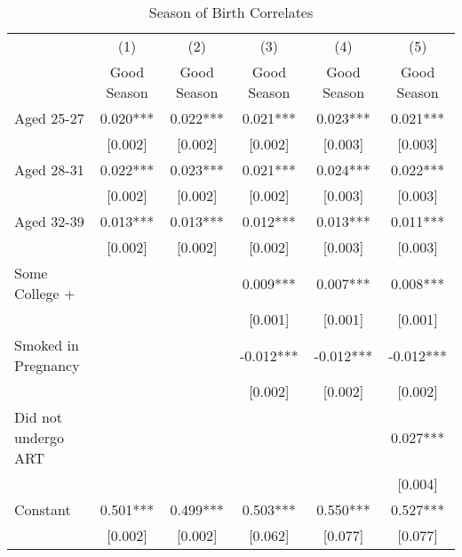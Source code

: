 \documentclass[a4paper, 12 pt]{article}
\theoremstyle{plain}
\begin{document}
\begin{doublespace}
\vspace{10mm}

\begin{table}[htbp]\centering
\def\sym#1{\ifmmode^{#1}\else\(^{#1}\)\fi}
\caption{Season of Birth Correlates  \label{tab:bqMain}}
\begin{tabular}{l*{5}{c}}
\toprule
                    &\multicolumn{1}{c}{(1)}   &\multicolumn{1}{c}{(2)}     &\multicolumn{1}{c}{(3)}   &\multicolumn{1}{c}{(4)}   &\multicolumn{1}{c}{(5)}   \\
                    & Good Season   & Good Season   &  Good Season   & Good Season   & Good Season   \\
\midrule
Aged 25-27          &       0.020***&       0.022***&       0.021***&       0.023***&       0.021***\\
                    &     [0.002]   &     [0.002]   &     [0.002]   &     [0.003]   &     [0.003]   \\
Aged 28-31          &       0.022***&       0.023***&       0.021***&       0.024***&       0.022***\\
                    &     [0.002]   &     [0.002]   &     [0.002]   &     [0.003]   &     [0.003]   \\
Aged 32-39          &       0.013***&       0.013***&       0.012***&       0.013***&       0.011***\\
                    &     [0.002]   &     [0.002]   &     [0.002]   &     [0.003]   &     [0.003]   \\
Some College +      &               &               &       0.009***&       0.007***&       0.008***\\
                    &               &               &     [0.001]   &     [0.001]   &     [0.001]   \\
Smoked in Pregnancy &               &               &      -0.012***&      -0.012***&      -0.012***\\
                    &               &               &     [0.002]   &     [0.002]   &     [0.002]   \\
Did not undergo ART &               &               &               &               &       0.027***\\
                    &               &               &               &               &     [0.004]   \\
Constant            &       0.501***&       0.499***&       0.503***&       0.550***&       0.527***\\
                    &     [0.002]   &     [0.002]   &     [0.062]   &     [0.077]   &     [0.077]   \\

\end{tabular}
\end{table}
\end{doublespace}
\end{document}
